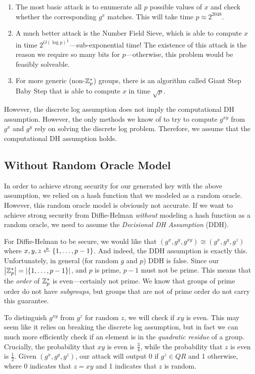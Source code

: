 \begin{enumerate}
	\item The most basic attack is to enumerate all $p$ possible values of $x$ and check whether the corresponding $g^x$ matches. This will take time $p \approx 2^{2048}$.
	\item A much better attack is the Number Field Sieve, which is able to compute $x$ in time $2^{O(\log p)^{\frac{1}{3}}}$---sub-exponential time! The existence of this attack is the reason we require so many bits for $p$---otherwise, this problem would be feasibly solveable.
	\item For more generic (non-$\mathbb{Z}_p^*$) groups, there is an algorithm called Giant Step Baby Step that is able to compute $x$ in time $\sqrt{p}$.
\end{enumerate}

However, the discrete log assumption does not imply the computational DH assumption. However, the only methods we know of to try to compute $g^{xy}$ from $g^x$ and $g^y$ rely on solving the discrete log problem. Therefore, we assume that the computational DH assumption holds. 

\subsection{Without Random Oracle Model}
In order to achieve strong security for our generated key with the above assumption, we relied on a hash function that we modeled as a random oracle. However, this random oracle model is obviously not accurate. If we want to achieve strong security from Diffie-Helman \emph{without} modeling a hash function as a random oracle, we need to assume the \emph{Decisional DH Assumption} (DDH).

For Diffie-Helman to be secure, we would like that $(g^x, g^y, g^{xy}) \cong (g^x, g^y, g^z)$ where $x, y, z \rgets \set{1, \ldots, p-1}$. And indeed, the DDH assumption is exactly this. Unfortunately, in general (for random $g$ and $p$) DDH is false. Since our $\left| \mathbb{Z}_p^* \right| = \left| \left\{ 1, \ldots, p-1 \right\} \right|$, and $p$ is prime, $p-1$ must not be prime. This means that the \emph{order} of $\mathbb{Z}_p^*$ is even---certainly not prime. We know that groups of prime order do not have \emph{subgroups}, but groups that are not of prime order do not carry this guarantee.

To distinguish $g^{xy}$ from $g^z$ for random $z$, we will check if $xy$ is even. This may seem like it relies on breaking the discrete log assumption, but in fact we can much more efficiently check if an element is in the \emph{quadratic residue} of a group. Crucially, the probability that $xy$ is even is $\tfrac{3}{4}$, while the probability that $z$ is even is $\tfrac{1}{2}$. Given $(g^x, g^y, g^z)$, our attack will output 0 if $g^z \in QR$ and 1 otherwise, where 0 indicates that $z = xy$ and 1 indicates that $z$ is random.

